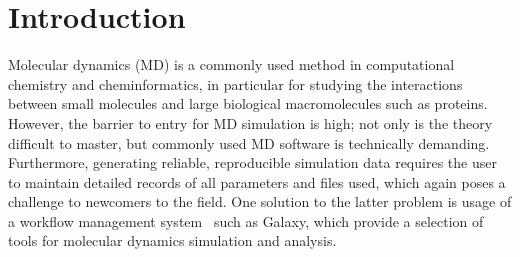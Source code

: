\documentclass[twocolumn]{bmcart}%
\begin{document}
\begin{frontmatter}
\begin{abstractbox}
\begin{keyword}
\end{keyword}


\end{abstractbox}
%

\end{frontmatter}






\hypertarget{introduction}{%
\section*{Introduction}\label{introduction}}

Molecular dynamics (MD) is a commonly used method in computational chemistry and cheminformatics, in particular for studying the interactions between small molecules and large biological macromolecules such as proteins.~\cite{berendsen01} However, the barrier to entry for MD simulation is high; not only is the theory difficult to master, but commonly used MD software is technically demanding. Furthermore, generating reliable, reproducible simulation data requires the user to maintain detailed records of all parameters and files used, which again poses a challenge to newcomers to the field. One solution to the latter problem is usage of a workflow management system~\cite{senapathi_biomolecular_2019} such as Galaxy, which provide a selection of tools for molecular dynamics simulation and analysis.
\end{document}
